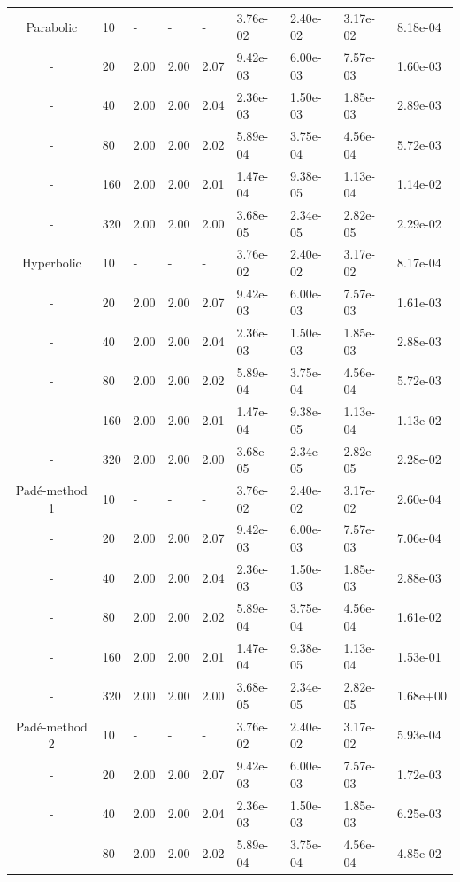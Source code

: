 \begin{table}[p]
{\begin{tabular}{cllllllll}
   \hline
   Parabolic &  10 & - & - & - & 3.76e-02 & 2.40e-02 & 3.17e-02 & 8.18e-04 \\ 
   - &   20 & 2.00 & 2.00 & 2.07 & 9.42e-03 & 6.00e-03 & 7.57e-03 & 1.60e-03 \\ 
   - &   40 & 2.00 & 2.00 & 2.04 & 2.36e-03 & 1.50e-03 & 1.85e-03 & 2.89e-03 \\ 
   - &   80 & 2.00 & 2.00 & 2.02 & 5.89e-04 & 3.75e-04 & 4.56e-04 & 5.72e-03 \\ 
   - &  160 & 2.00 & 2.00 & 2.01 & 1.47e-04 & 9.38e-05 & 1.13e-04 & 1.14e-02 \\ 
   - &  320 & 2.00 & 2.00 & 2.00 & 3.68e-05 & 2.34e-05 & 2.82e-05 & 2.29e-02 \\
   \hline
   Hyperbolic & 10 & - & - & - & 3.76e-02 & 2.40e-02 & 3.17e-02 & 8.17e-04 \\ 
   - &   20 & 2.00 & 2.00 & 2.07 & 9.42e-03 & 6.00e-03 & 7.57e-03 & 1.61e-03 \\ 
   - &   40 & 2.00 & 2.00 & 2.04 & 2.36e-03 & 1.50e-03 & 1.85e-03 & 2.88e-03 \\ 
   - &   80 & 2.00 & 2.00 & 2.02 & 5.89e-04 & 3.75e-04 & 4.56e-04 & 5.72e-03 \\ 
   - &  160 & 2.00 & 2.00 & 2.01 & 1.47e-04 & 9.38e-05 & 1.13e-04 & 1.13e-02 \\ 
   - &  320 & 2.00 & 2.00 & 2.00 & 3.68e-05 & 2.34e-05 & 2.82e-05 & 2.28e-02 \\
   \hline
   Pad\'e-method 1  &  10 & - & - & - & 3.76e-02 & 2.40e-02 & 3.17e-02 & 2.60e-04 \\ 
   -  &  20 & 2.00 & 2.00 & 2.07 & 9.42e-03 & 6.00e-03 & 7.57e-03 & 7.06e-04 \\ 
   -  &  40 & 2.00 & 2.00 & 2.04 & 2.36e-03 & 1.50e-03 & 1.85e-03 & 2.88e-03 \\ 
   -  &  80 & 2.00 & 2.00 & 2.02 & 5.89e-04 & 3.75e-04 & 4.56e-04 & 1.61e-02 \\ 
   -  & 160 & 2.00 & 2.00 & 2.01 & 1.47e-04 & 9.38e-05 & 1.13e-04 & 1.53e-01 \\ 
   -  & 320 & 2.00 & 2.00 & 2.00 & 3.68e-05 & 2.34e-05 & 2.82e-05 & 1.68e+00 \\
   \hline
   Pad\'e-method 2 &  10 & - & - & - & 3.76e-02 & 2.40e-02 & 3.17e-02 & 5.93e-04 \\ 
   - &  20 & 2.00 & 2.00 & 2.07 & 9.42e-03 & 6.00e-03 & 7.57e-03 & 1.72e-03 \\ 
   - &  40 & 2.00 & 2.00 & 2.04 & 2.36e-03 & 1.50e-03 & 1.85e-03 & 6.25e-03 \\ 
   - &  80 & 2.00 & 2.00 & 2.02 & 5.89e-04 & 3.75e-04 & 4.56e-04 & 4.85e-02 \\ 

\end{tabular}}
\end{table}
